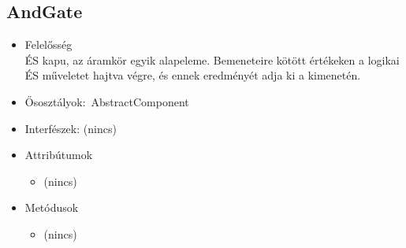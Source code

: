 \subsection{AndGate}
\begin{itemize}
\item Felelősség\\
ÉS kapu, az áramkör egyik alapeleme. Bemeneteire kötött értékeken a logikai ÉS műveletet hajtva végre, és ennek eredményét adja ki a kimenetén.
\item Ősosztályok:\ AbstractComponent
\item Interfészek: (nincs)
\item Attribútumok $\ $
\begin{itemize}
\item (nincs)
\end{itemize}
\item Metódusok$\ $
\begin{itemize}
\item (nincs)
\end{itemize}
\end{itemize}

